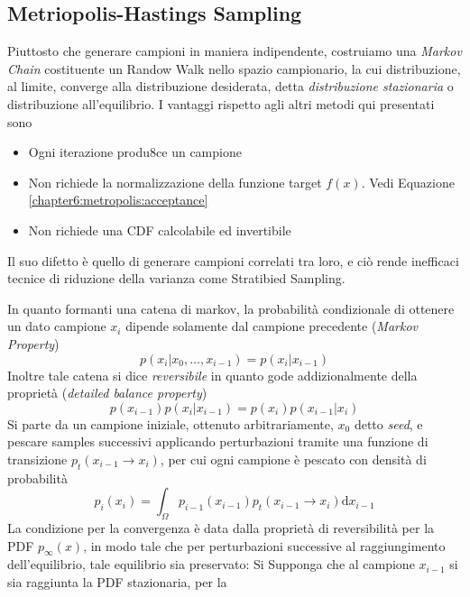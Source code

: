 \subsection{Metriopolis-Hastings Sampling}
Piuttosto che generare campioni in maniera indipendente, costruiamo una \textit{Markov Chain} costituente un Randow Walk nello spazio campionario,
la cui distribuzione, al limite, converge alla distribuzione desiderata, detta \textit{distribuzione stazionaria} o distribuzione all'equilibrio. I 
vantaggi rispetto agli altri metodi qui presentati sono
\begin{itemize}[topsep=0pt,noitemsep]
	\item Ogni iterazione produ8ce un campione
	\item Non richiede la normalizzazione della funzione target $f(x)$. Vedi Equazione \ref{chapter6:metropolis:acceptance}
	\item Non richiede una CDF calcolabile ed invertibile
\end{itemize}
Il suo difetto \`e quello di generare campioni correlati tra loro, e ci\`o rende inefficaci tecnice di riduzione della varianza come Stratibied 
Sampling.\par
In quanto formanti una catena di markov, la probabilit\`a condizionale di ottenere un dato campione $x_i$ dipende solamente dal campione precedente
(\textit{Markov Property})
\begin{equation}
	p(x_i | x_0,\ldots,x_{i-1})=p(x_i|x_{i-1})
\end{equation}
Inoltre tale catena si dice \textit{reversibile} in quanto gode addizionalmente della propriet\`a (\textit{detailed balance property})
\begin{equation}
	p(x_{i-1})p(x_i|x_{i-1})=p(x_i)p(x_{i-1}|x_i)
\end{equation}
Si parte da un campione iniziale, ottenuto arbitrariamente, $x_0$ detto \textit{seed}, e pescare samples successivi applicando perturbazioni tramite 
una funzione di transizione\footnotemark{} $p_t(x_{i-1}\to x_i)$, per cui ogni campione \`e pescato con densit\`a di probabilit\`a
\begin{equation}%
	p_i(x_i)=\int_{\Omega}p_{i-1}(x_{i-1})p_t(x_{i-1}\to x_i)\mathrm{d}x_{i-1}
\end{equation}
La condizione per la convergenza \`e data dalla propriet\`a di reversibilit\`a per la PDF $p_\infty(x)$, in modo tale che per perturbazioni successive 
al raggiungimento dell'equilibrio, tale equilibrio sia preservato: Si Supponga che al campione $x_{i-1}$ si sia raggiunta la PDF stazionaria, per la 
